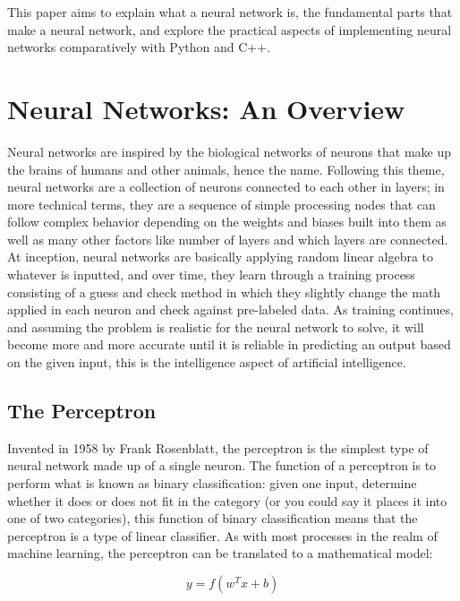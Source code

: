 \documentclass[12pt, letter]{article}
\begin{document}
This paper aims to explain what a neural network is, the fundamental parts that make a neural network, and explore the practical aspects of implementing neural networks comparatively with Python and C++. 

\section{Neural Networks: An Overview}

	Neural networks are inspired by the biological networks of neurons that make up the brains of humans and other animals, hence the name. Following this theme, neural networks are a collection of neurons connected to each other in layers; in more technical terms, they are a sequence of simple processing nodes that can follow complex behavior depending on the weights and biases built into them as well as many other factors like number of layers and which layers are connected. At inception, neural networks are basically applying random linear algebra to whatever is inputted, and over time, they learn through a training process consisting of a guess and check method in which they slightly change the math applied in each neuron and check against pre-labeled data. As training continues, and assuming the problem is realistic for the neural network to solve, it will become more and more accurate until it is reliable in predicting an output based on the given input, this is the intelligence aspect of artificial intelligence. 

\begin{singlespacing}\subsection{The Perceptron}\end{singlespacing} 


Invented in 1958 by Frank Rosenblatt, the perceptron is the simplest type of neural network made up of a single neuron. The function of a perceptron is to perform what is known as binary classification: given one input, determine whether it does or does not fit in the category (or you could say it places it into one of two categories), this function of binary classification means that the perceptron is a type of linear classifier. As with most processes in the realm of machine learning, the perceptron can be translated to a mathematical model:

\begin{equation}
y = f(w^Tx+b)
\end{equation}
\end{document}
